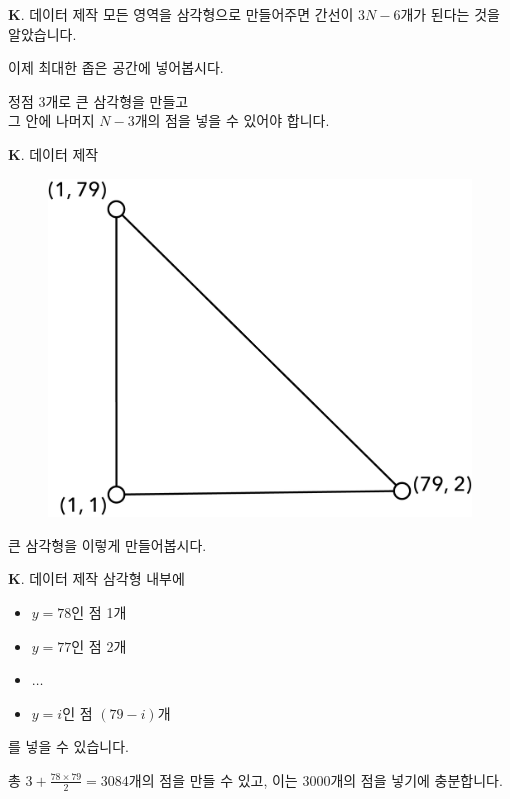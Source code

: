 \begin{frame}{\textbf{K}. 데이터 제작}
    모든 영역을 삼각형으로 만들어주면 간선이 $3N-6$개가 된다는 것을 알았습니다.
    
    \vspace{18pt}
    
    이제 최대한 좁은 공간에 넣어봅시다.
    
    정점 3개로 큰 삼각형을 만들고\\
    그 안에 나머지 $N-3$개의 점을 넣을 수 있어야 합니다.
\end{frame}

\begin{frame}{\textbf{K}. 데이터 제작}
    
    \begin{figure}[h!]
        \centering
        \includegraphics[width=0.35\linewidth]{../images/v-e-f/sol8.png}
    \end{figure}
    
    \vspace{18pt}
    
    큰 삼각형을 이렇게 만들어봅시다.
\end{frame}

\begin{frame}{\textbf{K}. 데이터 제작}
    삼각형 내부에
    \begin{itemize}
        \item $y = 78$인 점 1개
        \item $y = 77$인 점 2개
        \item $\ldots$
        \item $y = i$인 점 $(79-i)$개
    \end{itemize}
    를 넣을 수 있습니다.
    
    \vspace{18pt}
    
    총 $3 + \frac{78 \times 79}{2} = 3084$개의 점을 만들 수 있고, 이는 $3000$개의 점을 넣기에 충분합니다.
\end{frame}

